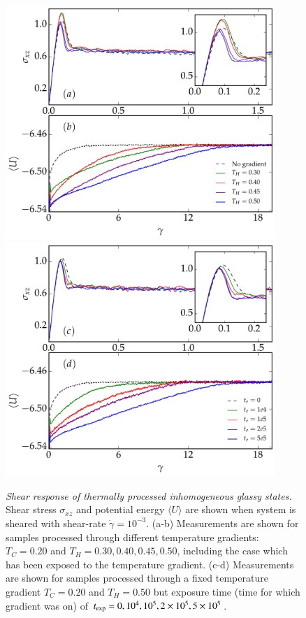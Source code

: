 \begin{figure}[hbt!]
\centering
\includegraphics[width=10.2cm]{./figs/shearResponse.pdf}
\includegraphics[width=10.2cm]{./figs/shearResponse_exp.pdf}
\caption[{\em Shear response of thermally processed inhomogeneous glassy states.}]{{\em Shear response of thermally processed inhomogeneous glassy states.} Shear stress $\sigma_{xz}$ and potential energy $\langle U \rangle$ are shown when system is sheared with shear-rate $\dot{\gamma} = 10^{-3}$. (a-b) Measurements are shown for samples processed through different temperature gradients: $T_C = 0.20$ and $T_H = 0.30, 0.40, 0.45, 0.50$, including the case which has been exposed to the temperature gradient. (c-d) Measurements are shown for samples processed through a fixed temperature gradient $T_C = 0.20$ and $T_H = 0.50$ but exposure time (time for which gradient was on) of $t_{\rm exp} = 0, 10^4, 10^5, 2\times10^5, 5\times10^5$.}
\label{shear}
\end{figure}

